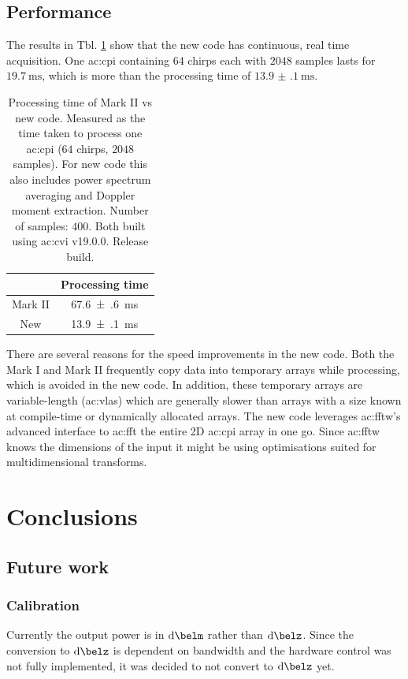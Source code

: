 \documentclass{article}
\begin{document}
\subsection{Performance}
The results in Tbl. \ref{tbl:ProcTime} show that the new code has continuous, real time acquisition. One \acrshort{ac:cpi} containing \(64\) chirps each with \(2048\) samples lasts for \(\SI{19.7}{\milli\second}\), which is more than the processing time of \(\SI{13.9(1)}{\milli\second}\).

\begin{table}[H]
	\centering
	\begin{tabular}{|c|c|}
		\hline
		        & Processing time             \\
		\hline
		Mark II & \SI{67.6(6)}{\milli\second} \\
		\hline
		New     & \SI{13.9(1)}{\milli\second} \\
		\hline
	\end{tabular}
	\caption{Processing time of Mark II vs new code. Measured as the time taken to process one \acrshort{ac:cpi} (\(64\) chirps, \(2048\) samples). For new code this also includes power spectrum averaging and Doppler moment extraction. Number of samples: \(400\). Both built using \acrshort{ac:cvi} v19.0.0. Release build.}
	\label{tbl:ProcTime}
\end{table}

There are several reasons for the speed improvements in the new code.
Both the Mark I and Mark II frequently copy data into temporary arrays while processing, which is avoided in the new code.
In addition, these temporary arrays are variable-length (\acrshort{ac:vla}s) which are generally slower than arrays with a size known at compile-time or dynamically allocated arrays.
The new code leverages \acrshort{ac:fftw}'s advanced interface to \acrshort{ac:fft} the entire 2D \acrshort{ac:cpi} array in one go. Since \acrshort{ac:fftw} knows the dimensions of the input it might be using optimisations suited for multidimensional transforms.

\section{Conclusions}
\subsection{Future work}
\subsubsection{Calibration}
Currently the output power is in \(\si{\deci\belm}\) rather than \(\si{\deci\belz}\). Since the conversion to \(\si{\deci\belz}\) is dependent on bandwidth and the hardware control was not fully implemented, it was decided to not convert to \(\si{\deci\belz}\) yet.
\end{document}
